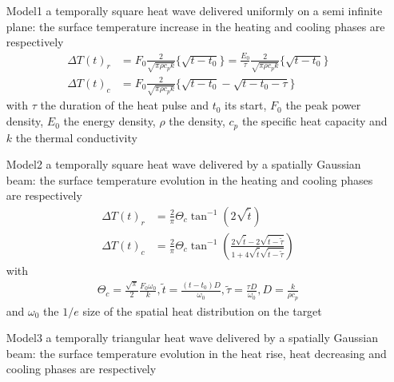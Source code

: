 \begin{itemize}
\item[Model1] a temporally square heat wave delivered uniformly on a semi infinite plane: the surface temperature increase in the heating and cooling phases are respectively\cite{Behrisch1980}
\begin{equation}
\label{eq:square1}
\begin{aligned}
{\Delta T(t)}_r &= F_0 \frac{2}{ \sqrt{\pi \rho c_p k }} \lbrace { \sqrt{t-t_0} } \rbrace = \frac{E_0}{\tau} \frac{2}{ \sqrt{\pi \rho c_p k }} \lbrace { \sqrt{t-t_0} } \rbrace \\ {\Delta T(t)}_c &= F_0 \frac{2}{ \sqrt{\pi \rho c_p k} } \lbrace { \sqrt{t-t_0} - \sqrt{t-t_0 - {\tau}} } \rbrace
\end{aligned}
\end{equation}
with $\tau$ the duration of the heat pulse and $t_0$ its start, $F_0$ the peak power density, $E_0$ the energy density, $\rho$ the density, $c_p$ the specific heat capacity and $k$ the thermal conductivity
\item[Model2] a temporally square heat wave delivered by a spatially Gaussian beam: the surface temperature evolution in the heating and cooling phases are respectively\cite{Bauerle2011}
\begin{equation}
\label{eq:square2}
\begin{aligned}
{\Delta T(t)}_r &= \frac{2}{\pi} {\Theta}_c \tan^{ -1}(2 \sqrt{ \tilde{t}} ) 
\\ 
{\Delta T(t)}_c &= \frac{2}{\pi} {\Theta}_c \tan^{ -1} \left( \frac{2 \sqrt{ \tilde{t}} - 2 \sqrt{ \tilde{t} - \tilde{\tau} }}{ 1+4 \sqrt{ \tilde{t}} \sqrt{ \tilde{t} - \tilde{\tau} }} \right)
\end{aligned}
\end{equation}
with
\begin{equation}
\label{eq:square3}
\begin{aligned}
{\Theta}_c = \frac{\sqrt{\pi}}{2} \frac{F_0 {\omega}_0}{k} , \tilde{t} = \frac{(t-t_0) D}{{\omega}_0} , \tilde{\tau} = \frac{\tau D}{{\omega}_0} , D = \frac{k}{ \rho c_p }
\end{aligned}
\end{equation}
and $\omega_0$ the $1/e$ size of the spatial heat distribution on the target
\item[Model3] a temporally triangular heat wave delivered by a spatially Gaussian beam: the surface temperature evolution in the heat rise, heat decreasing and cooling phases are respectively

\end{itemize}
